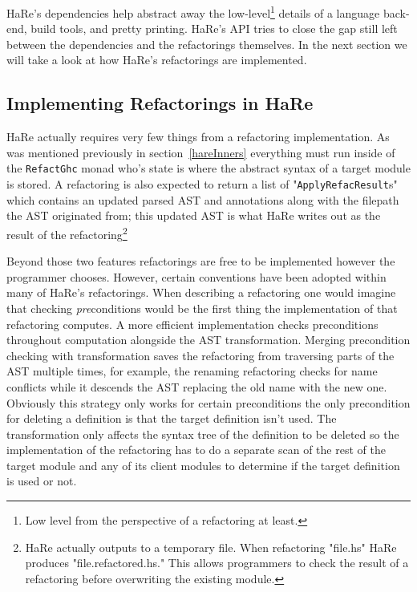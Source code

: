 HaRe's dependencies help abstract away the low-level\footnote{Low level from the perspective of a refactoring at least.} details of a language back-end, build tools, and pretty printing. HaRe's API tries to close the gap still left between the dependencies and the refactorings themselves. In the next section we will take a look at how HaRe's refactorings are implemented.

\subsection{Implementing Refactorings in HaRe}

HaRe actually requires very few things from a refactoring implementation. As was mentioned previously in section~\ref{hareInners} everything must run inside of the \texttt{RefactGhc} monad who's state is where the abstract syntax of a target module is stored. A refactoring is also expected to return a list of  "\texttt{ApplyRefacResult}s" which contains an updated parsed AST and annotations along with the filepath the AST originated from; this updated AST is what HaRe writes out as the result of the refactoring\footnote{HaRe actually outputs to a temporary file. When refactoring "file.hs" HaRe produces "file.refactored.hs." This allows programmers to check the result of a refactoring before overwriting the existing module.}  


Beyond those two features refactorings are free to be implemented however the programmer chooses. However, certain conventions have been adopted within many of HaRe's refactorings. When describing a refactoring one would imagine that checking \textit{pre}conditions would be the first thing the implementation of that refactoring computes. A more efficient implementation checks preconditions throughout computation alongside the AST transformation. Merging precondition checking with transformation saves the refactoring from traversing parts of the AST multiple times, for example, the renaming refactoring checks for name conflicts while it descends the AST replacing the old name with the new one. Obviously this strategy only works for certain preconditions the only precondition for deleting a definition is that the target definition isn't used. The transformation only affects the syntax tree of the definition to be deleted so the implementation of the refactoring has to do a separate scan of the rest of the target module and any of its client modules to determine if the target definition is used or not. 

